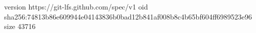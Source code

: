 version https://git-lfs.github.com/spec/v1
oid sha256:74813b86e609944e04143836b0bad12b841af008b8c4b65bf604ff6989523e96
size 43716
